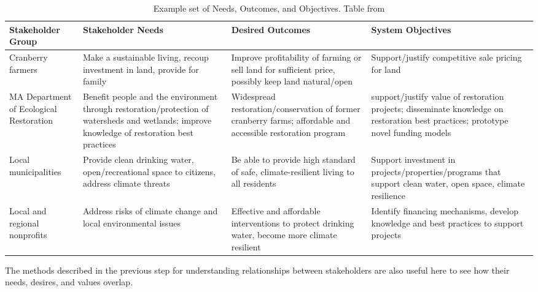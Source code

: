 \begin{table}[!htb]
\caption[Example Set of Needs, Outcomes, and Objectives]{Example set of Needs, Outcomes, and Objectives. Table from \cite{jaffeEnvironmentalEconomicSystems2022}}
\label{tab:need-outcome-objective}
\begin{center}
\scriptsize
\begin{tabular}{ L{1.75cm} | L{3.75cm} | L{3.75cm} | L{3.75cm} } \hline

\textbf{Stakeholder Group} & \textbf{Stakeholder Needs} & \textbf{Desired Outcomes} & System Objectives \\ \hline

Cranberry farmers & Make a sustainable living, recoup investment in land, provide for family & Improve profitability of farming or sell land for sufficient price, possibly keep land natural/open & Support/justify competitive sale pricing for land \\ \hline

MA Department of Ecological Restoration & Benefit people and the environment through restoration/protection of watersheds and wetlands; improve knowledge of restoration best practices & Widespread restoration/conservation of former cranberry farms; affordable and accessible restoration program & support/justify value of restoration projects; disseminate knowledge on restoration best practices; prototype novel funding models \\ \hline

Local municipalities & Provide clean drinking water, open/recreational space to citizens, address climate threats & Be able to provide high standard of safe, climate-resilient living to all residents & Support investment in projects/properties/programs that support clean water, open space, climate resilience \\ \hline

Local and regional nonprofits & Address risks of climate change and local environmental issues & Effective and affordable interventions to protect drinking water, become more climate resilient & Identify financing mechanisms, develop knowledge and best practices to support projects \\ \hline 

\end{tabular}
\end{center}
\end{table}

The methods described in the previous step for understanding relationships between stakeholders are also useful here to see how their needs, desires, and values overlap.

